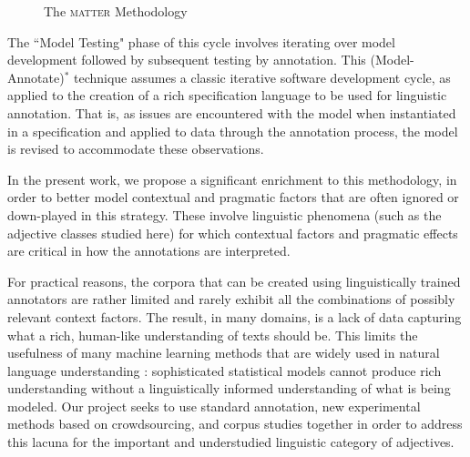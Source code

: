 \documentclass[10pt]{article}
\begin{document}
\begin{figure}[h]
  \centering
  \caption{The \textsc{matter} Methodology}
  \label{fig:matter}
\end{figure}

\noindent 
The ``Model Testing" phase of this cycle involves iterating over model development followed by subsequent testing by annotation. This  (Model-Annotate)$^*$ technique assumes a classic iterative software development cycle, as applied to the creation of a rich specification language to be used for linguistic annotation.  That is, as issues are encountered
with the model when instantiated in a specification and applied to data
through the annotation process, the model is revised to accommodate
these observations. 

In the present work, we propose a significant enrichment to this methodology, in order to better
model  contextual and pragmatic factors that are often ignored or down-played in this strategy. 
These involve linguistic phenomena (such as the adjective classes studied here) for which contextual factors and pragmatic effects are critical in how the annotations are interpreted.  


For practical reasons, the corpora that can be created using linguistically trained annotators are rather limited and rarely exhibit all the combinations of possibly relevant context factors. The result, in many domains, is a lack of data capturing what a rich, human-like understanding of texts should be. This limits the usefulness of many machine learning methods that are widely used in natural language understanding \cite{manning1999foundations,wasserman2004all,murphy2012machine}: sophisticated statistical models cannot produce rich understanding without a linguistically informed understanding of what is being modeled. Our project seeks to use standard annotation, new experimental methods based on crowdsourcing, and corpus studies together in order to address this lacuna for the important and understudied linguistic category of adjectives.
\end{document}
